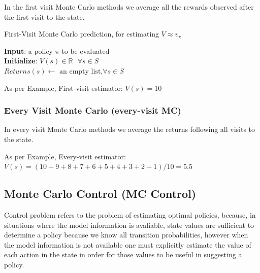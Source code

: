 In the first visit Monte Carlo methods we average all the rewards observed after the first visit to the state.

\begin{algorithm}[h!]
    \caption{First-Visit Monte Carlo prediction, for estimating $V \approx v_\pi$}

    \textbf{Input}: a policy $\pi$ to be evaluated\\

    \textbf{Initialize}:
    $V(s) \in \mathbb{R} \text{ } \forall s \in S$\\
    $Returns(s) \leftarrow \text{ an empty list,} \forall s\in S$\\

\end{algorithm}


As per Example, First-visit estimator: $V(s) = 10$


\subsubsection{Every Visit Monte Carlo (every-visit MC) \cite{medium/nerd-for-tech/monte-carlo-methods-for-reinforcement-learning-d30d874dd817}}

In every visit Monte Carlo methods we average the returns following all visits to the state.


As per Example, Every-visit estimator: $V(s) = (10+9+8+7+6+5+4+3+2+1)/10 = 5.5$


\subsection{Monte Carlo Control (MC Control) \cite{medium/nerd-for-tech/monte-carlo-methods-for-reinforcement-learning-d30d874dd817}}

Control problem refers to the problem of estimating optimal policies, because, in situations where the model information is avaliable, state values are sufficient to determine a policy because we know all transition probabilities, however when the model information is not available one must explicitly estimate the value of each action in the state in order for those values to be useful in suggesting a policy.

